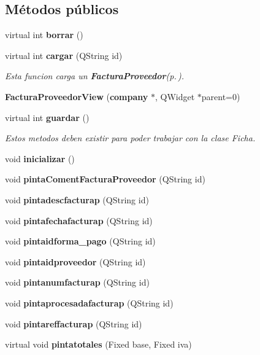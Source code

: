 \subsection*{M\'{e}todos p\'{u}blicos}
\begin{CompactItemize}
\item 
virtual int {\bf borrar} ()\label{classFacturaProveedorView_a0}

\item 
virtual int {\bf cargar} (QString id)\label{classFacturaProveedorView_a1}

\begin{CompactList}\small\item\em Esta funcion carga un {\bf Factura\-Proveedor}{\rm (p.\,\pageref{classFacturaProveedor})}. \item\end{CompactList}\item 
{\bf Factura\-Proveedor\-View} ({\bf company} $\ast$, QWidget $\ast$parent=0)
\item 
virtual int {\bf guardar} ()\label{classFacturaProveedorView_a3}

\begin{CompactList}\small\item\em Estos metodos deben existir para poder trabajar con la clase Ficha. \item\end{CompactList}\item 
void {\bf inicializar} ()
\item 
void {\bf pinta\-Coment\-Factura\-Proveedor} (QString id)\label{classFacturaProveedorView_a5}

\item 
void {\bf pintadescfacturap} (QString id)\label{classFacturaProveedorView_a6}

\item 
void {\bf pintafechafacturap} (QString id)\label{classFacturaProveedorView_a7}

\item 
void {\bf pintaidforma\_\-pago} (QString id)\label{classFacturaProveedorView_a8}

\item 
void {\bf pintaidproveedor} (QString id)\label{classFacturaProveedorView_a9}

\item 
void {\bf pintanumfacturap} (QString id)\label{classFacturaProveedorView_a10}

\item 
void {\bf pintaprocesadafacturap} (QString id)\label{classFacturaProveedorView_a11}

\item 
void {\bf pintareffacturap} (QString id)\label{classFacturaProveedorView_a12}

\item 
virtual void {\bf pintatotales} (Fixed base, Fixed iva)\label{classFacturaProveedorView_a13}

\end{CompactItemize}


